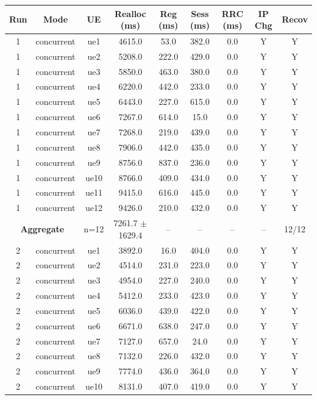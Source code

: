 \begin{table}[ht]
\centering
\begin{tabular}{|c|c|c|c|c|c|c|c|c|}
\hline
Run & Mode & UE & Realloc (ms) & Reg (ms) & Sess (ms) & RRC (ms) & IP Chg & Recov \\
\hline
1 & concurrent & ue1 & 4615.0 & 53.0 & 382.0 & 0.0 & Y & Y \\
1 & concurrent & ue2 & 5208.0 & 222.0 & 429.0 & 0.0 & Y & Y \\
1 & concurrent & ue3 & 5850.0 & 463.0 & 380.0 & 0.0 & Y & Y \\
1 & concurrent & ue4 & 6220.0 & 442.0 & 233.0 & 0.0 & Y & Y \\
1 & concurrent & ue5 & 6443.0 & 227.0 & 615.0 & 0.0 & Y & Y \\
1 & concurrent & ue6 & 7267.0 & 614.0 & 15.0 & 0.0 & Y & Y \\
1 & concurrent & ue7 & 7268.0 & 219.0 & 439.0 & 0.0 & Y & Y \\
1 & concurrent & ue8 & 7906.0 & 442.0 & 435.0 & 0.0 & Y & Y \\
1 & concurrent & ue9 & 8756.0 & 837.0 & 236.0 & 0.0 & Y & Y \\
1 & concurrent & ue10 & 8766.0 & 409.0 & 434.0 & 0.0 & Y & Y \\
1 & concurrent & ue11 & 9415.0 & 616.0 & 445.0 & 0.0 & Y & Y \\
1 & concurrent & ue12 & 9426.0 & 210.0 & 432.0 & 0.0 & Y & Y \\
\multicolumn{2}{|c|}{\textbf{Aggregate}} & n=12 & 7261.7 $\pm$ 1629.4 & -- & -- & -- & -- & 12/12 \\
\hline
2 & concurrent & ue1 & 3892.0 & 16.0 & 404.0 & 0.0 & Y & Y \\
2 & concurrent & ue2 & 4514.0 & 231.0 & 223.0 & 0.0 & Y & Y \\
2 & concurrent & ue3 & 4954.0 & 227.0 & 240.0 & 0.0 & Y & Y \\
2 & concurrent & ue4 & 5412.0 & 233.0 & 423.0 & 0.0 & Y & Y \\
2 & concurrent & ue5 & 6036.0 & 439.0 & 422.0 & 0.0 & Y & Y \\
2 & concurrent & ue6 & 6671.0 & 638.0 & 247.0 & 0.0 & Y & Y \\
2 & concurrent & ue7 & 7127.0 & 657.0 & 24.0 & 0.0 & Y & Y \\
2 & concurrent & ue8 & 7132.0 & 226.0 & 432.0 & 0.0 & Y & Y \\
2 & concurrent & ue9 & 7774.0 & 436.0 & 364.0 & 0.0 & Y & Y \\
2 & concurrent & ue10 & 8131.0 & 407.0 & 419.0 & 0.0 & Y & Y \\

\end{tabular}
\end{table}
